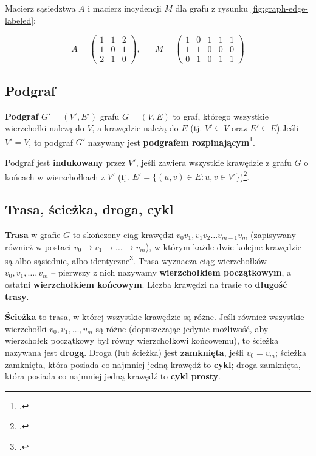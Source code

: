 Macierz sąsiedztwa $A$ i macierz incydencji $M$ dla grafu z rysunku \ref{fig:graph-edge-labeled}:

\[A = 
 \begin{pmatrix}
  1 & 1 & 2 \\
  1 & 0 & 1 \\
  2 & 1 & 0 
 \end{pmatrix}, \hspace{20pt}
 M = 
 \begin{pmatrix}
  1 & 0 & 1 & 1 & 1 \\
  1 & 1 & 0 & 0 & 0 \\
  0 & 1 & 0 & 1 & 1 
 \end{pmatrix}
\]

\subsection*{Podgraf}
\textbf{Podgraf} $G'=(V',E')$ grafu $G=(V,E)$ to graf, którego wszystkie wierzchołki nalezą do $V$, a krawędzie należą do $E$ (tj. $V' \subseteq V$ oraz $E' \subseteq E$).Jeśli $V' = V$, to podgraf $G'$ nazywany jest \textbf{podgrafem rozpinającym}\footcite[229]{banachowski}. 

Podgraf jest \textbf{indukowany} przez $V'$, jeśli zawiera wszystkie krawędzie z grafu $G$ o końcach w wierzchołkach z $V'$ (tj. $E'=\{(u,v) \in E: u,v \in V' \}$)\footcite[1195]{cormen}.

\subsection*{Trasa, ścieżka, droga, cykl}

\textbf{Trasa} w grafie $G$ to skończony ciąg krawędzi $v_0v_1,v_1v_2\ldots v_{m-1}v_m$ (zapisywany również w postaci $v_0 \rightarrow v_1 \rightarrow \ldots \rightarrow v_m$), w którym każde dwie kolejne krawędzie są albo sąsiednie, albo identyczne\footcite[41]{wilson}. Trasa wyznacza ciąg wierzchołków $v_0,v_1,\ldots,v_m$ -- pierwszy z nich nazywamy \textbf{wierzchołkiem początkowym}, a ostatni \textbf{wierzchołkiem końcowym}. Liczba krawędzi na trasie to \textbf{długość trasy}. 

\textbf{Ścieżka} to trasa, w której wszystkie krawędzie są różne. Jeśli również wszystkie wierzchołki $v_0,v_1,\ldots,v_m$ są różne (dopuszczając jedynie możliwość, aby wierzchołek początkowy był równy wierzchołkowi końcowemu), to ścieżka nazywana jest \textbf{drogą}. Droga (lub ścieżka) jest \textbf{zamknięta}, jeśli $v_0 = v_m$; ścieżka zamknięta, która posiada co najmniej jedną krawędź to \textbf{cykl}; droga zamknięta, która posiada co najmniej jedną krawędź to \textbf{cykl prosty}.

